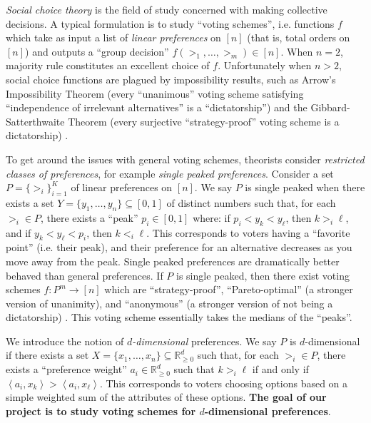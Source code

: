 \documentclass[12pt]{article}
\newcommand{\R}{\mathbb{R}}
\newcommand{\ip}[2]{\left\langle{#1},{#2}\right\rangle}
\newcommand{\1}[1]{\mathds{1}[{#1}]}
\begin{document}
  \emph{Social choice theory} is the field of study
  concerned with making collective decisions. A typical formulation
  is to study ``voting schemes'', i.e.
  functions $f$ which take as input a list of \emph{linear
  preferences} on $[n]$ (that is, total orders on $[n]$) and outputs a
  ``group decision'' $f(>_1,\ldots,>_m) \in [n]$.
  When $n = 2$, majority rule constitutes an excellent choice of $f$.
  Unfortunately when $n>2$, social choice functions are
  plagued by impossibility results,
  such as Arrow's Impossibility Theorem (every ``unanimous'' voting scheme
  satisfying ``independence of irrelevant alternatives'' is a ``dictatorship'')
  and the Gibbard-Satterthwaite Theorem (every surjective 
  ``strategy-proof'' voting scheme is a dictatorship) 
  \cite{AgtBookMechDesignInto}.

  To get around the issues with general voting schemes, theorists
  consider \emph{restricted classes of preferences},
  for example \emph{single peaked preferences}.
  Consider a set $P = \{>_i\}_{i=1}^K$ of linear preferences on $[n]$.
  We say $P$ is single peaked when there exists a set
  $Y = \{y_1,\ldots,y_n\} \subseteq [0,1]$ of distinct numbers such that,
  for each $>_i \in P$, there exists a ``peak'' $p_i \in [0,1]$
  where: if $p_i < y_k < y_\ell$, then $k >_i \ell$,
  and if $y_k < y_\ell < p_i$, then $k <_i \ell$.
  This corresponds to voters having a ``favorite point'' (i.e.
  their peak), and their preference for an alternative decreases
  as you move away from the peak.
  Single peaked preferences are dramatically better behaved
  than general preferences.
  If $P$ is single peaked, then there exist voting schemes
  $f : P^m \to [n]$ which are ``strategy-proof'',
  ``Pareto-optimal'' (a stronger
  version of unanimity), and ``anonymous'' (a stronger version
  of not being a dictatorship) \cite{AgtBookNoMoney}.
  This voting scheme essentially takes the medians of the ``peaks''.

  We introduce the notion of \emph{$d$-dimensional} preferences.
  We say $P$ is $d$-dimensional if there exists a set
  $X = \{x_1,\ldots,x_n\} \subseteq \R_{\ge 0}^d$ such that, for each $>_i \in P$,
  there exists a ``preference weight'' $a_i\in \R_{\ge 0}^d$ such that
  $k >_i \ell$ if and only if $\ip{a_i}{x_k} > \ip{a_i}{x_\ell}$.
  This corresponds to voters choosing options based on a simple weighted
  sum of the attributes of these options.
  \textbf{The goal of our project is to study voting schemes
  for $d$-dimensional preferences}.
\end{document}
